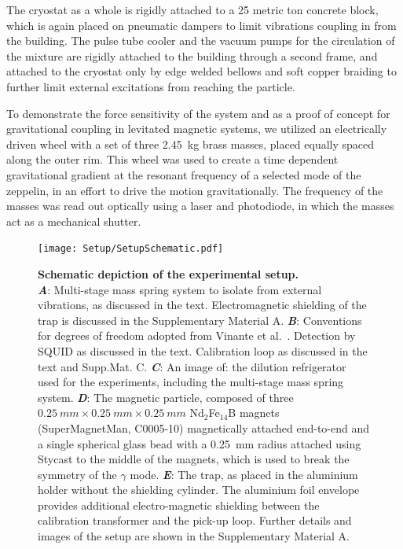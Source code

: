 \documentclass[pdflatex,sn-mathphys,12pt]{sn-jnl}
\begin{document}
    The cryostat as a whole is rigidly attached to a 25 metric ton concrete block, which is again placed on pneumatic dampers to limit vibrations coupling in from the building. The pulse tube cooler and the vacuum pumps for the circulation of the mixture are rigidly attached to the building through a second frame, and attached to the cryostat only by edge welded bellows and soft copper braiding to further limit external excitations from reaching the particle.
    
    To demonstrate the force sensitivity of the system and as a proof of concept for gravitational coupling in levitated magnetic systems, we utilized an electrically driven wheel with a set of three \SI{2.45}{kg} brass masses, placed equally spaced along the outer rim.
    This wheel was used to create a time dependent gravitational gradient at the resonant frequency of a selected mode of the zeppelin, in an effort to drive the motion gravitationally.
    The frequency of the masses was read out optically using a laser and photodiode, in which the masses act as a mechanical shutter.


    \begin{figure}[ht]
        \centering
        \texttt{[image: Setup/SetupSchematic.pdf]}%
        \caption{\textbf{Schematic depiction of the experimental setup.}\\
        \textbf{\emph{A}}: Multi-stage mass spring system to isolate from external vibrations, as discussed in the text. Electromagnetic shielding of the trap is discussed in the Supplementary Material A.
        \textbf{\emph{B}}: Conventions for degrees of freedom adopted from Vinante et al.~\cite{vinante2020}. Detection by SQUID as discussed in the text.  Calibration loop as discussed in the text and Supp.Mat. C. 
        \textbf{\emph{C}}: An image of: the dilution refrigerator used for the experiments, including the multi-stage mass spring system. 
        \textbf{\emph{D}}: The magnetic particle, composed of three $\SI{0.25}{mm} \times \SI{0.25}{mm} \times \SI{0.25}{mm}$ Nd$_{2}$Fe$_{14}$B magnets (SuperMagnetMan, C0005-10) magnetically attached end-to-end and a single spherical glass bead with a \SI{0.25}{mm} radius attached using Stycast to the middle of the magnets, which is used to break the symmetry of the $\gamma$ mode.
        \textbf{\emph{E}}: The trap, as placed in the aluminium holder without the shielding cylinder. The aluminium foil envelope provides additional electro-magnetic shielding between the calibration transformer and the pick-up loop.
        Further details and images of the setup are shown in the Supplementary Material A.
        }\label{fig1:setup}
    \end{figure}
\end{document}
